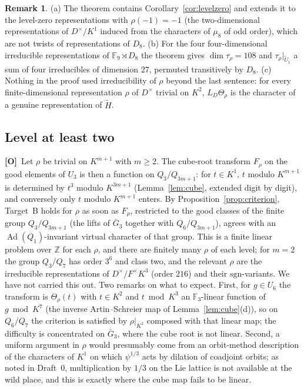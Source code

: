 \documentclass[11pt]{article}
\newcommand{\Z}{\mathbb Z}
\newcommand{\Fq}{\mathbb F}
\newcommand{\Ad}{\operatorname{Ad}}
\newcommand{\tH}{\widetilde H}
\newcommand{\tU}{\widetilde U}
\newcommand{\Otag}{\textnormal{\textbf{[O]}}}
\theoremstyle{plain}
\theoremstyle{definition}
\newtheorem{remark}[theorem]{Remark}
\begin{document}
\begin{remark}
(a) The theorem contains Corollary~\ref{cor:levelzero} and extends it to
the level-zero representations with $\rho(-1)=-1$ (the two-dimensional
representations of $D^\times/K^1$ induced from the characters of
$\mu_8$ of odd order), which are not twists of representations of $D_8$.
(b) For the four four-dimensional irreducible representations of
$\Fq_9\rtimes D_8$ the theorem gives $\dim\tau_\rho=108$ and
$\tau_\rho|_{\tU_1}$ a sum of four irreducibles of dimension $27$,
permuted transitively by $D_8$.
(c) Nothing in the proof used irreducibility of $\rho$ beyond the last
sentence: for every finite-dimensional representation $\rho$ of
$D^\times$ trivial on $K^2$, $L_D\Theta_\rho$ is the character of a
genuine representation of $\tH$.
\end{remark}

\subsection{Level at least two}\label{subsec:targetB}
\Otag\ Let $\rho$ be trivial on $K^{m+1}$ with $m\ge2$.  The
cube-root transform $F_\rho$ on the good elements of $U_3$ is then a
function on $Q_3/Q_{3m+1}$: for $t\in K^1$, $t$ modulo $K^{m+1}$ is
determined by $t^3$ modulo $K^{3m+1}$ (Lemma~\ref{lem:cube}, extended
digit by digit), and conversely only $t$ modulo $K^{m+1}$ enters.  By
Proposition~\ref{prop:criterion}, Target~B holds for $\rho$ as soon as
$F_\rho$, restricted to the good classes of the finite group
$Q_3/Q_{3m+1}$ (the lifts of $\bar G_3$ together with $Q_6/Q_{3m+1}$),
agrees with an $\Ad(Q_1)$-invariant virtual character of that group.
This is a finite linear problem over $\Z$ for each $\rho$, and there
are finitely many $\rho$ of each level; for $m=2$ the group
$Q_3/Q_7$ has order $3^6$ and class two, and the relevant $\rho$ are
the irreducible representations of $D^\times/F^\times K^3$ (order $216$)
and their $\mathrm{sgn}$-variants.  We have not carried this out.  Two
remarks on what to expect.  First, for $g\in U_6$ the transform is
$\Theta_\rho(t)$ with $t\in K^2$ and $t\bmod K^3$ an $\Fq_3$-linear
function of $g\bmod K^7$ (the inverse Artin--Schreier map of
Lemma~\ref{lem:cube}(d)), so on $Q_6/Q_7$ the criterion is satisfied by
$\rho|_{K^2}$ composed with that linear map; the difficulty is
concentrated on $\bar G_3$, where the cube root is not linear.  Second,
a uniform argument in $\rho$ would presumably come from an orbit-method
description of the characters of $K^1$ on which $\psi^{1/3}$ acts by
dilation of coadjoint orbits; as noted in Draft~0, multiplication by
$1/3$ on the Lie lattice is not available at the wild place, and this
is exactly where the cube map fails to be linear.
\end{document}
